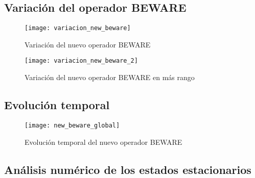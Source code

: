 \subsection{Variación del operador BEWARE}

\begin{figure}[h]
	\texttt{[image: variacion\_new\_beware]}
	\centering
	\caption{Variación del nuevo operador BEWARE }
	\label{vari_beware}
\end{figure}

\begin{figure}[h]
	\texttt{[image: variacion\_new\_beware\_2]}
	\centering
	\caption{Variación del nuevo operador BEWARE en más rango}
	\label{vari_beware_2}
\end{figure}

\subsection{Evolución temporal}

\begin{figure}[h]
	\texttt{[image: new\_beware\_global]}
	\centering
	\caption{Evolución temporal del nuevo operador BEWARE}
	\label{evolu_beware}
\end{figure}

\subsection{Análisis numérico de los estados estacionarios}


